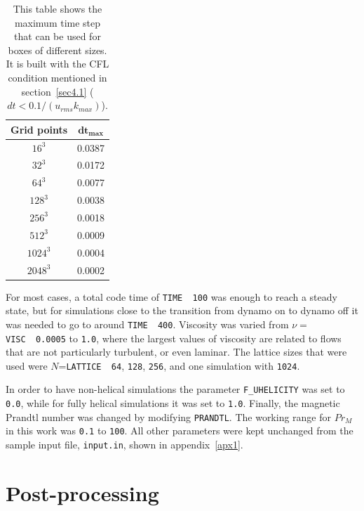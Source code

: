 \documentclass[12pt,a4paper]{report}
\begin{document}
\begin{table}[h]
\begin{center}
\begin{tabular}{|c|c|}
\hline
\textbf{Grid points} & $\bm{dt_{max}}$ \\
\hline
  $16^3$            &  0.0387          \\ \hline
  $32^3$            &  0.0172          \\ \hline
  $64^3$            &  0.0077          \\ \hline
  $128^3$            &  0.0038          \\ \hline
  $256^3$            &  0.0018          \\ \hline
  $512^3$            &  0.0009          \\ \hline
  $1024^3$            &  0.0004          \\ \hline
  $2048^3$            &  0.0002       \\ \hline
\end{tabular}
\end{center}
\caption{This table shows the maximum time step that can be used for boxes of different sizes. It is built with the CFL condition mentioned in section~\ref{sec4.1} ($dt < 0.1 / (u_{rms} k_{max})$).}
\label{table4.2}
\end{table}

For most cases, a total code time of \texttt{TIME~~100} was enough to reach a steady state, but for simulations close to the transition from dynamo on to dynamo off it was needed to go to around \texttt{TIME~~400}. Viscosity was varied from $\nu=$\texttt{VISC~~0.0005} to \texttt{1.0}, where the largest values of viscosity are related to flows that are not particularly turbulent, or even laminar. The lattice sizes that were used were $N$=\texttt{LATTICE~~64}, \texttt{128}, \texttt{256}, and one simulation with \texttt{1024}.

In order to have non-helical simulations the parameter \texttt{F\_UHELICITY} was set to \texttt{0.0}, while for fully helical simulations it was set to \texttt{1.0}. Finally, the magnetic Prandtl number was changed by modifying \texttt{PRANDTL}. The working range for $Pr_M$ in this work was \texttt{0.1} to \texttt{100}. All other parameters were kept unchanged from the sample input file, \texttt{input.in}, shown in appendix~\ref{apx1}.

\section{Post-processing}
\end{document}
